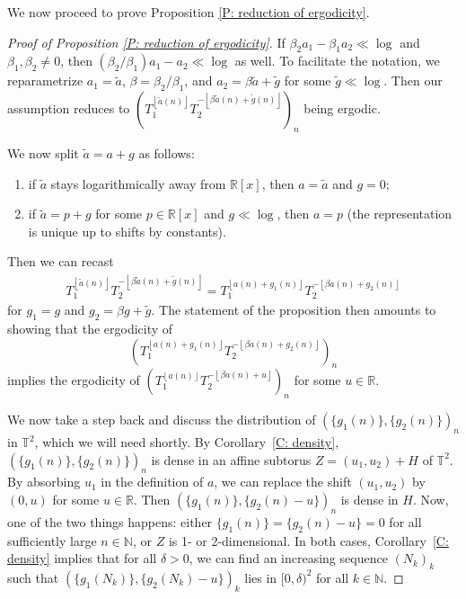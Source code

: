 \documentclass[11pt]{amsart}
\theoremstyle{definition}
\newcommand{\N}{{\mathbb N}}
\newcommand{\R}{{\mathbb R}}
\newcommand{\T}{{\mathbb T}}
\newcommand{\1}{{\mathbf{1}}}
\newcommand{\floor}[1]{{\left \lfloor #1 \right \rfloor}}
\begin{document}
We now proceed to prove Proposition \ref{P: reduction of ergodicity}. 
\begin{proof}[Proof of Proposition \ref{P: reduction of ergodicity}]
If  $\beta_2 a_1 - \beta_1 a_2 \ll \log$ and $\beta_1,\beta_2\neq 0$, then $(\beta_2/\beta_1) a_1 - a_2 \ll \log$ as well. To facilitate the notation, we reparametrize $a_1 = \tilde a$, $\beta = \beta_2/\beta_1$, and $a_2 = \beta \tilde a + \tilde g$ for some $\tilde g\ll\log$. Then our assumption reduces to $(T_1^{\floor{\tilde a(n)}}T_2^{-\floor{\beta \tilde a(n) + \tilde g(n)}})_n$ being ergodic.

We now split $\tilde a ={a} + {g}$ as follows:
    \begin{enumerate}
        \item if $\tilde a$ stays logarithmically away from $\R[x]$, then $a = \tilde{a} $ and ${g} = 0$;
        \item if $\tilde a = p + {g}$ for some $p\in\R[x]$ and ${g} \ll \log$, then ${a} = p$ (the representation is unique up to shifts by constants). %
    \end{enumerate}
    Then we can recast
    \begin{align*}
        T_1^{\floor{\tilde a(n)}}T_2^{-\floor{\beta \tilde a(n) + \tilde g(n)}} = T_1^{\floor{{a}(n)+g_1(n)}}T_2^{-\floor{\beta {a}(n) + g_2(n)}}
    \end{align*}
    for $g_1 = {g}$ and $g_2 = \beta {g} +\tilde g$.
    The statement of the proposition then amounts to showing that the ergodicity of $$(T_1^{\floor{{a}(n)+g_1(n)}}T_2^{-\floor{\beta {a}(n) + g_2(n)}})_n$$ implies the ergodicity of $(T_1^{\floor{{a}(n)}}T_2^{-\floor{\beta {a}(n) + u}})_n$ for some $u\in\R$.

    We now take a step back and discuss the distribution of $(\{g_1(n)\}, \{g_2(n)\})_n$ in $\T^2$, which we will need shortly. By Corollary~\ref{C: density}, $(\{g_1(n)\}, \{g_2(n)\})_n$ is dense in an {affine subtorus} $Z = (u_1,u_2)+H$ of $\T^2$. By absorbing $u_1$ in the definition of ${a}$, we can replace the shift $(u_1, u_2)$ by $(0,u)$ for some $u\in\R$. Then $(\{g_1(n)\}, \{g_2(n)-u\})_n$ is dense in $H$. Now, one of the two things happens: either $\{g_1(n)\} = \{g_2(n)-u\} = 0$ for all sufficiently large $n\in\N$, or $Z$ is 1- or 2-dimensional. In both cases, Corollary~\ref{C: density} implies that for all $\delta>0$, we can find an increasing sequence $(N_k)_k$ such that $(\{g_1(N_k)\}, \{g_2(N_k)-u\})_k$ lies in $[0, \delta)^2$ for all $k\in\N$.
    

\end{proof}
\end{document}
